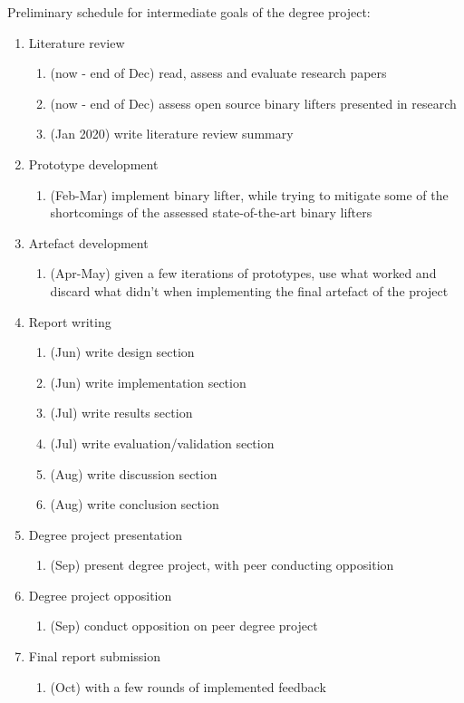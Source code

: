 \documentclass[12pt, a4paper]{article}
\begin{document}
Preliminary schedule for intermediate goals of the degree project:

\begin{enumerate}
	\item Literature review
	\begin{enumerate}
		\item (now - end of Dec) read, assess and evaluate research papers
		\item (now - end of Dec) assess open source binary lifters presented in research
		\item (Jan 2020) write literature review summary
	\end{enumerate}
	\item Prototype development
	\begin{enumerate}
		\item (Feb-Mar) implement binary lifter, while trying to mitigate some of the shortcomings of the assessed state-of-the-art binary lifters
	\end{enumerate}
	\item Artefact development
	\begin{enumerate}
		\item (Apr-May) given a few iterations of prototypes, use what worked and discard what didn't when implementing the final artefact of the project
	\end{enumerate}
	\item Report writing
	\begin{enumerate}
		\item (Jun) write design section
		\item (Jun) write implementation section
		\item (Jul) write results section
		\item (Jul) write evaluation/validation section
		\item (Aug) write discussion section
		\item (Aug) write conclusion section
	\end{enumerate}
	\item Degree project presentation
	\begin{enumerate}
		\item (Sep) present degree project, with peer conducting opposition
	\end{enumerate}
	\item Degree project opposition
	\begin{enumerate}
		\item (Sep) conduct opposition on peer degree project
	\end{enumerate}
	\item Final report submission
	\begin{enumerate}
		\item (Oct) with a few rounds of implemented feedback
	\end{enumerate}
\end{enumerate}
\end{document}
